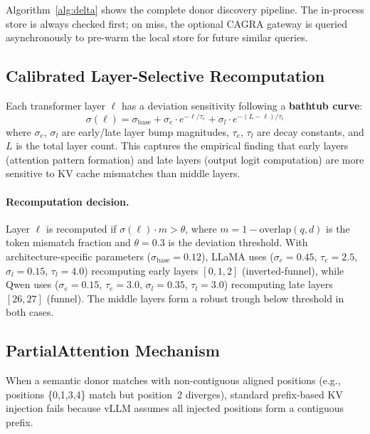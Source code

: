 \documentclass[10pt,twocolumn]{article}
\begin{document}
Algorithm~\ref{alg:delta} shows the complete donor discovery pipeline.
The in-process store is always checked first; on miss, the optional
CAGRA gateway is queried asynchronously to pre-warm the local store
for future similar queries.

\subsection{Calibrated Layer-Selective Recomputation}
\label{sec:recomp}

Each transformer layer $\ell$ has a deviation sensitivity following a
\textbf{bathtub curve}:
\begin{equation}
  \sigma(\ell) = \sigma_\text{base} + \sigma_e \cdot e^{-\ell/\tau_e} + \sigma_l \cdot e^{-(L-\ell)/\tau_l}
  \label{eq:bathtub}
\end{equation}
where $\sigma_e$, $\sigma_l$ are early/late layer bump magnitudes,
$\tau_e$, $\tau_l$ are decay constants, and $L$ is the total layer
count. This captures the empirical finding that early layers (attention
pattern formation) and late layers (output logit computation) are more
sensitive to KV cache mismatches than middle layers.

\paragraph{Recomputation decision.} Layer $\ell$ is recomputed if
$\sigma(\ell) \cdot m > \theta$, where $m = 1 - \text{overlap}(q,d)$ is
the token mismatch fraction and $\theta = 0.3$ is the deviation threshold.
With architecture-specific parameters ($\sigma_\text{base}{=}0.12$),
LLaMA uses ($\sigma_e{=}0.45$, $\tau_e{=}2.5$, $\sigma_l{=}0.15$,
$\tau_l{=}4.0$) recomputing early layers $[0,1,2]$ (inverted-funnel),
while Qwen uses ($\sigma_e{=}0.15$, $\tau_e{=}3.0$, $\sigma_l{=}0.35$,
$\tau_l{=}3.0$) recomputing late layers $[26,27]$ (funnel). The middle
layers form a robust trough below threshold in both cases.

\subsection{PartialAttention Mechanism}
\label{sec:partial}

When a semantic donor matches with non-contiguous aligned positions
(e.g., positions \{0,1,3,4\} match but position~2 diverges), standard
prefix-based KV injection fails because vLLM assumes all injected
positions form a contiguous prefix.
\end{document}
